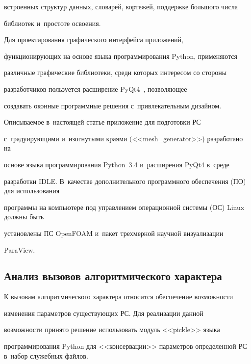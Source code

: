 встроенных структур данных, словарей, кортежей, поддержке большого числа 


библиотек и~простоте освоения.


  


   Для проектирования графического интерфейса приложений, 


функционирующих на основе языка программирования Python, применяются 


различные графические библиотеки, среди которых интересом со стороны 


разработчиков пользуется расширение PyQt4~\cite{10-ch}, позволяющее 


создавать оконные про\-грам\-мные решения с~привлекательным дизайном.


   


   Описываемое в~настоящей статье приложение для подготовки РС 


с~градуирующими и~изогнутыми краями (<<mesh\_generator>>) разработано на 


основе языка программирования Python~3.4 и~расширения PyQt4 в~среде 


разработки IDLE. В~качестве дополнительного программного обеспечения (ПО) для использования 


программы на компьютере под управлением операционной системы (ОС) Linux должны быть 


установлены ПС OpenFOAM и~пакет трехмерной научной визуализации 


ParaView. 


   


\subsection{Анализ вызовов алгоритмического характера}





  К вызовам алгоритмического характера относится обеспечение возможности 


изменения параметров существующих РС. Для реализации данной 


возможности принято решение использовать модуль <<pickle>> языка 


программирования Python для <<консервации>> параметров определенной РС в~набор служебных файлов.


  


